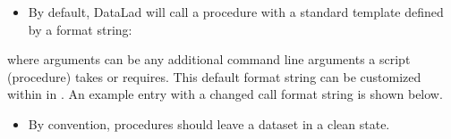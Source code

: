 \begin{itemize}
\begin{sphinxVerbatim}[commandchars=\\\{\}]
\end{sphinxVerbatim}

\item {} 
\sphinxAtStartPar
By default, DataLad will call a procedure with a standard template defined by a format string:
\begin{quote}

\begin{sphinxVerbatim}[commandchars=\\\{\}]
   
\end{sphinxVerbatim}
\end{quote}

\end{itemize}

\sphinxAtStartPar
where arguments can be any additional command line arguments a script (procedure) takes or requires.
This default format string can be customized within  in .
An example  entry with a changed call format string is shown below.
\begin{quote}

\begin{sphinxVerbatim}[commandchars=\\\{\}]
\end{sphinxVerbatim}
\end{quote}
\begin{itemize}
\item {} 
\sphinxAtStartPar
By convention, procedures should leave a dataset in a clean state.

\end{itemize}

